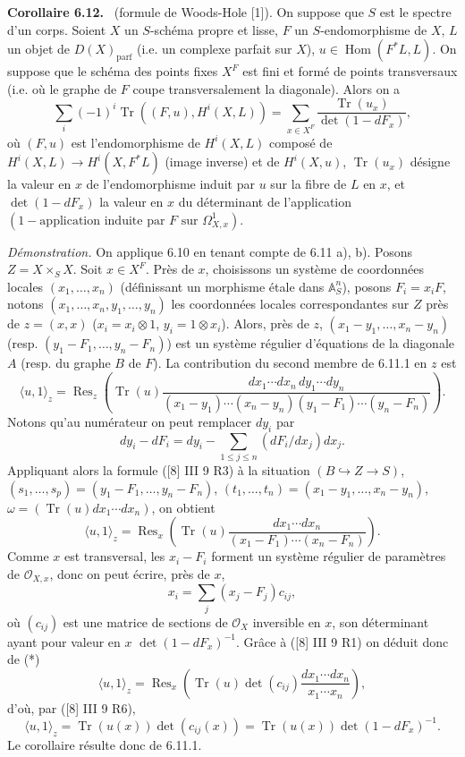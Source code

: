 \documentclass[11pt]{article}
\newenvironment{statement}[1]{\par\medskip\noindent\textbf{#1.}\ }{\par\medskip}
\DeclareMathOperator{\Hom}{Hom}
\providecommand{\OO}{\mathcal{O}}
\providecommand{\parf}{\mathrm{parf}}
\providecommand{\Hom}{\operatorname{Hom}}
\providecommand{\parf}{\mathrm{parf}}
\providecommand{\Hom}{\operatorname{Hom}}
\begin{document}
\begin{statement}{Corollaire 6.12}
(formule de Woods-Hole [1]). On suppose que $S$ est le spectre d'un corps. Soient $X$ un $S$-schéma propre et lisse, $F$ un $S$-endomorphisme de $X$, $L$ un objet de $D(X)_{\parf}$ (i.e. un complexe parfait sur $X$), $u\in\Hom(F^*L,L)$. On suppose que le schéma des points fixes $X^F$ est fini et formé de points transversaux (i.e. où le graphe de $F$ coupe transversalement la diagonale). Alors on a
\[
\sum_i(-1)^i\operatorname{Tr}((F,u),H^i(X,L))=
\sum_{x\in X^F}\frac{\operatorname{Tr}(u_x)}{\det(1-dF_x)},
\]
où $(F,u)$ est l'endomorphisme de $H^i(X,L)$ composé de $H^i(X,L)\to H^i(X,F^*L)$ (image inverse) et de $H^i(X,u)$, $\operatorname{Tr}(u_x)$ désigne la valeur en $x$ de l'endomorphisme induit par $u$ sur la fibre de $L$ en $x$, et $\det(1-dF_x)$ la valeur en $x$ du déterminant de l'application $(1-\text{application induite par }F\text{ sur }\Omega^1_{X,x})$.

\emph{Démonstration.} On applique 6.10 en tenant compte de 6.11 a), b). Posons $Z=X\times_S X$. Soit $x\in X^F$. Près de $x$, choisissons un système de coordonnées locales $(x_1,\ldots,x_n)$ (définissant un morphisme étale dans $\mathbb A_S^n$), posons $F_i=x_iF$, notons $(x_1,\ldots,x_n,y_1,\ldots,y_n)$ les coordonnées locales correspondantes sur $Z$ près de $z=(x,x)$ ($x_i=x_i\otimes1$, $y_i=1\otimes x_i$). Alors, près de $z$, $(x_1-y_1,\ldots,x_n-y_n)$ (resp. $(y_1-F_1,\ldots,y_n-F_n)$) est un système régulier d'équations de la diagonale $A$ (resp. du graphe $B$ de $F$). La contribution du second membre de 6.11.1 en $z$ est
\[
\langle u,1\rangle_z=
\operatorname{Res}_z\left(\operatorname{Tr}(u)\frac{dx_1\cdots dx_n\,dy_1\cdots dy_n}{(x_1-y_1)\cdots(x_n-y_n)(y_1-F_1)\cdots(y_n-F_n)}\right).
\]
Notons qu'au numérateur on peut remplacer $dy_i$ par
\[
dy_i-dF_i=dy_i-\sum_{1\le j\le n}(dF_i/dx_j)dx_j.
\]
Appliquant alors la formule ([8] III 9 R3) à la situation $(B\hookrightarrow Z\to S)$, $(s_1,\ldots,s_p)=(y_1-F_1,\ldots,y_n-F_n)$, $(t_1,\ldots,t_n)=(x_1-y_1,\ldots,x_n-y_n)$, $\omega=(\operatorname{Tr}(u)dx_1\cdots dx_n)$, on obtient
\begin{equation}
\tag{*}
\langle u,1\rangle_z=
\operatorname{Res}_x\left(\operatorname{Tr}(u)\frac{dx_1\cdots dx_n}{(x_1-F_1)\cdots(x_n-F_n)}\right).
\end{equation}
Comme $x$ est transversal, les $x_i-F_i$ forment un système régulier de paramètres de $\OO_{X,x}$, donc on peut écrire, près de $x$,
\[
x_i=\sum_j(x_j-F_j)c_{ij},
\]
où $(c_{ij})$ est une matrice de sections de $\OO_X$ inversible en $x$, son déterminant ayant pour valeur en $x$ $\det(1-dF_x)^{-1}$. Grâce à ([8] III 9 R1) on déduit donc de (*)
\[
\langle u,1\rangle_z=\operatorname{Res}_x\left(\operatorname{Tr}(u)\det(c_{ij})\frac{dx_1\cdots dx_n}{x_1\cdots x_n}\right),
\]
d'où, par ([8] III 9 R6),
\[
\langle u,1\rangle_z=\operatorname{Tr}(u(x))\det(c_{ij}(x))=\operatorname{Tr}(u(x))\det(1-dF_x)^{-1}.
\]
Le corollaire résulte donc de 6.11.1.
\end{statement}
\end{document}
